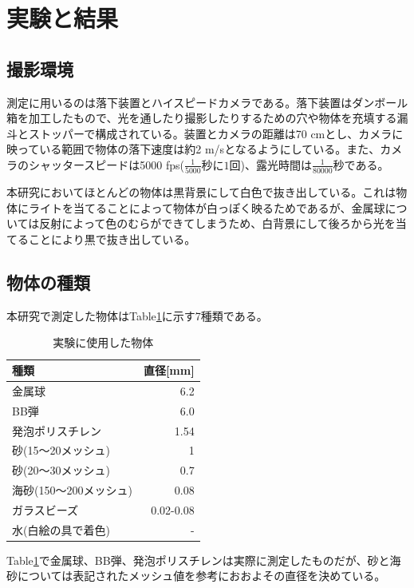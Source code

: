 \documentclass[a4j,12pt,dvipdfmx]{jsarticle}
\begin{document}
\section{実験と結果}
\subsection{撮影環境}
測定に用いるのは落下装置とハイスピードカメラである。落下装置はダンボール箱を加工したもので、光を通したり撮影したりするための穴や物体を充填する漏斗とストッパーで構成されている。装置とカメラの距離は70 cmとし、カメラに映っている範囲で物体の落下速度は約2 m/sとなるようにしている。また、カメラのシャッタースピードは5000 fps($\frac{1}{5000}秒に1回$)、露光時間は$\frac{1}{80000}秒$である。 \par
本研究においてほとんどの物体は黒背景にして白色で抜き出している。これは物体にライトを当てることによって物体が白っぽく映るためであるが、金属球については反射によって色のむらができてしまうため、白背景にして後ろから光を当てることにより黒で抜き出している。
\subsection{物体の種類}
本研究で測定した物体はTable\ref{tb:ballkind}に示す7種類である。 \\
\begin{table}[H]
	\caption{実験に使用した物体 \label{tb:ballkind}}
	\begin{tabular}{lr}
		\toprule
		種類 & 直径[mm] \\
		\midrule
		金属球 & 6.2 \\
		BB弾 & 6.0 \\
		発泡ポリスチレン & 1.54 \\
		砂(15〜20メッシュ) & 1 \\
		砂(20〜30メッシュ) & 0.7 \\
		海砂(150〜200メッシュ) & 0.08 \\
		ガラスビーズ & 0.02-0.08 \\
		水(白絵の具で着色) & - \\
		\bottomrule
	\end{tabular}
\end{table}

Table\ref{tb:ballkind}で金属球、BB弾、発泡ポリスチレンは実際に測定したものだが、砂と海砂については表記されたメッシュ値を参考におおよその直径を決めている。 \par
\end{document}
